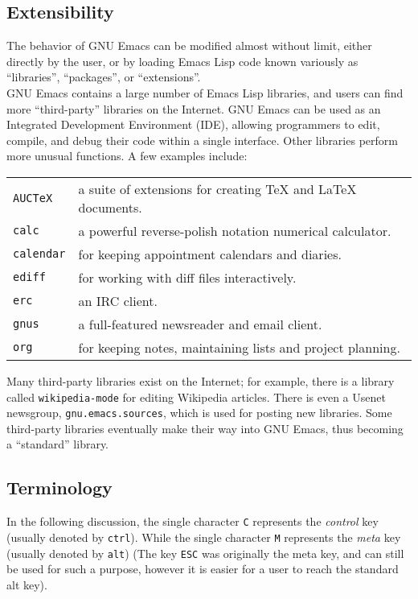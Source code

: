 \documentclass[12pt,a4paper,oneside]{article}
\begin{document}
\subsection{Extensibility}
The behavior of GNU Emacs can be modified almost without limit, either directly by the user, or by loading Emacs Lisp code known variously as ``libraries'', ``packages'', or ``extensions''.\\

GNU Emacs contains a large number of Emacs Lisp libraries, and users can find more ``third-party'' libraries on the Internet. GNU Emacs can be used as an Integrated Development Environment (IDE), allowing programmers to edit, compile, and debug their code within a single interface. Other libraries perform more unusual functions. A few examples include:\\

\begin{multicols}
  \begin{tabular}{@{}ll@{}}
    \texttt{AUCTeX} & a suite of extensions for creating {\TeX} and {\LaTeX} documents.\\
    \texttt{calc} & a powerful reverse-polish notation numerical calculator.\\
    \texttt{calendar} & for keeping appointment calendars and diaries.\\
    \texttt{ediff} & for working with diff files interactively.\\
    \texttt{erc} & an IRC client.\\
    \texttt{gnus} & a full-featured newsreader and email client.\\
    \texttt{org} & for keeping notes, maintaining lists and project planning.\\
  \end{tabular}
\end{multicols}

Many third-party libraries exist on the Internet; for example, there is a library called \texttt{wikipedia-mode} for editing Wikipedia articles. There is even a Usenet newsgroup, \texttt{gnu.emacs.sources}, which is used for posting new libraries. Some third-party libraries eventually make their way into GNU Emacs, thus becoming a ``standard'' library.

\subsection{Terminology}
In the following discussion, the single character \texttt{C} represents the \emph{control} key (usually denoted by \texttt{ctrl}).  While the single character \texttt{M} represents the \emph{meta} key (usually denoted by \texttt{alt}) (The key \texttt{ESC} was originally the meta key, and can still be used for such a purpose, however it is easier for a user to reach the standard alt key).\\
\end{document}
